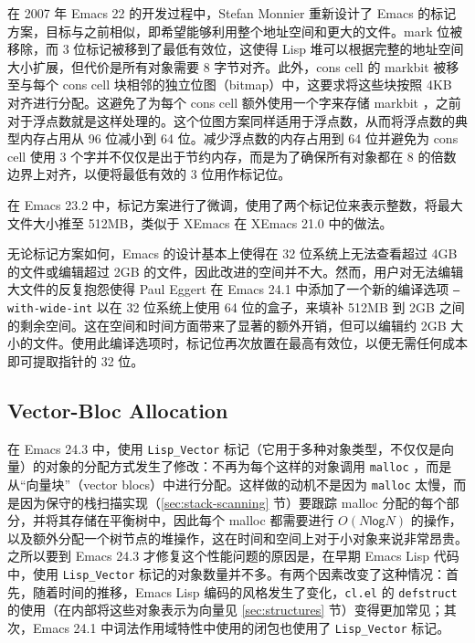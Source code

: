 \documentclass[format=acmsmall,screen]{acmart}
\begin{document}
在 2007 年 Emacs 22 的开发过程中，Stefan Monnier 重新设计了 Emacs 的标记方案，目标与之前相似，即希望能够利用整个地址空间和更大的文件。mark 位被移除，而 3 位标记被移到了最低有效位，这使得 Lisp 堆可以根据完整的地址空间大小扩展，但代价是所有对象需要 8 字节对齐。此外，cons cell 的 markbit 被移至与每个 cons cell 块相邻的独立位图（bitmap）中，这要求将这些块按照 4KB 对齐进行分配。这避免了为每个 cons cell 额外使用一个字来存储 markbit ，之前对于浮点数就是这样处理的。这个位图方案同样适用于浮点数，从而将浮点数的典型内存占用从 96 位减小到 64 位。减少浮点数的内存占用到 64 位并避免为 cons cell 使用 3 个字并不仅仅是出于节约内存，而是为了确保所有对象都在 8 的倍数边界上对齐，以便将最低有效的 3 位用作标记位。

在 Emacs 23.2 中，标记方案进行了微调，使用了两个标记位来表示整数，将最大文件大小推至 512MB，类似于 XEmacs 在 XEmacs 21.0 中的做法。

无论标记方案如何，Emacs 的设计基本上使得在 32 位系统上无法查看超过 4GB 的文件或编辑超过 2GB 的文件，因此改进的空间并不大。然而，用户对无法编辑大文件的反复抱怨使得 Paul Eggert 在 Emacs 24.1 中添加了一个新的编译选项 \texttt{--with-wide-int} 以在 32 位系统上使用 64 位的盒子，来填补 512MB 到 2GB 之间的剩余空间。这在空间和时间方面带来了显著的额外开销，但可以编辑约 2GB 大小的文件。使用此编译选项时，标记位再次放置在最高有效位，以便无需任何成本即可提取指针的 32 位。


\subsection{Vector-Bloc Allocation}
\label{sec:vectors}

在 Emacs 24.3 中，使用 \texttt{Lisp\_Vector} 标记（它用于多种对象类型，不仅仅是向量）的对象的分配方式发生了修改：不再为每个这样的对象调用 \texttt{malloc} ，而是从“向量块”（vector blocs）中进行分配。这样做的动机不是因为 \texttt{malloc} 太慢，而是因为保守的栈扫描实现（\ref{sec:stack-scanning} 节）要跟踪 malloc 分配的每个部分，并将其存储在平衡树中，因此每个 malloc 都需要进行 $O(N \textsf{log} N)$ 的操作，以及额外分配一个树节点的堆操作，这在时间和空间上对于小对象来说非常昂贵。之所以要到 Emacs 24.3 才修复这个性能问题的原因是，在早期 Emacs Lisp 代码中，使用 \texttt{Lisp\_Vector} 标记的对象数量并不多。有两个因素改变了这种情况：首先，随着时间的推移，Emacs Lisp 编码的风格发生了变化，\texttt{cl.el} 的 \texttt{defstruct} 的使用（在内部将这些对象表示为向量见 \ref{sec:structures} 节）变得更加常见；其次，Emacs 24.1 中词法作用域特性中使用的闭包也使用了 \texttt{Lisp\_Vector} 标记。
\end{document}
